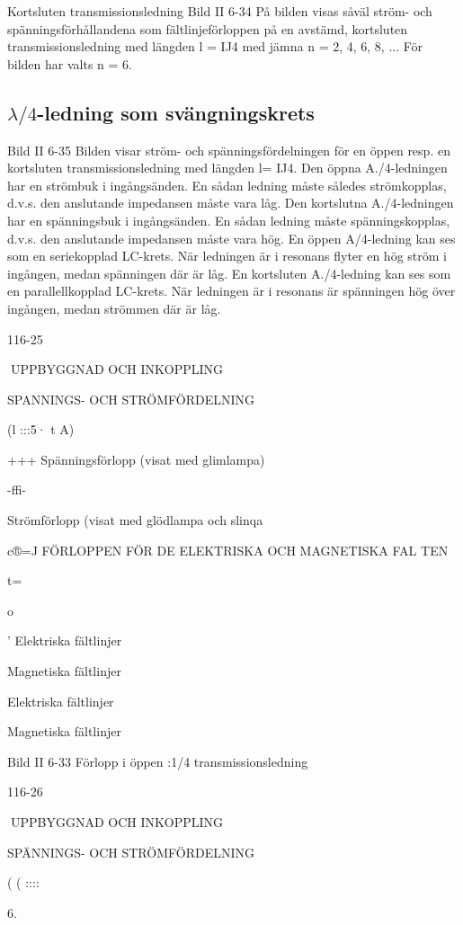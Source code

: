 Kortsluten transmissionsledning
Bild II 6-34
På bilden visas såväl ström- och spänningsförhållandena som fältlinjeförloppen
på en avstämd, kortsluten transmissionsledning med längden l = IJ4 med jämna n =
2, 4, 6, 8, ... För bilden har valts n = 6.

\subsection{\(\lambda/4\)-ledning som svängningskrets}

Bild II 6-35
Bilden visar ström- och spänningsfördelningen för en öppen resp. en kortsluten
transmissionsledning med längden l= IJ4.
Den öppna A./4-ledningen har en strömbuk i ingångsänden. En sådan ledning måste
således strömkopplas, d.v.s. den anslutande impedansen måste vara låg.
Den kortslutna A./4-ledningen har en
spänningsbuk i ingångsänden. En sådan
ledning måste spänningskopplas, d.v.s. den
anslutande impedansen måste vara hög.
En öppen A/4-ledning kan ses som en
seriekopplad LC-krets. När ledningen är i
resonans flyter en hög ström i ingången,
medan spänningen där är låg.
En kortsluten A./4-ledning kan ses som
en parallellkopplad LC-krets. När ledningen
är i resonans är spänningen hög över ingången, medan strömmen där är låg.

116-25

UPPBYGGNAD OCH INKOPPLING

SPANNINGS- OCH STRÖMFÖRDELNING

(l :::5· t A)

+++
Spänningsförlopp
(visat med glimlampa)

-ffi-

Strömförlopp
(visat med glödlampa
och slinqa

c®=J
FÖRLOPPEN FÖR DE ELEKTRISKA OCH MAGNETISKA FAL TEN

t=

o

' Elektriska fältlinjer

Magnetiska fältlinjer

Elektriska fältlinjer

Magnetiska fältlinjer

Bild II 6-33 Förlopp i öppen :1/4 transmissionsledning

116-26

UPPBYGGNAD OCH INKOPPLING

SPÄNNINGS- OCH STRÖMFÖRDELNING

( ( ::::

6.

